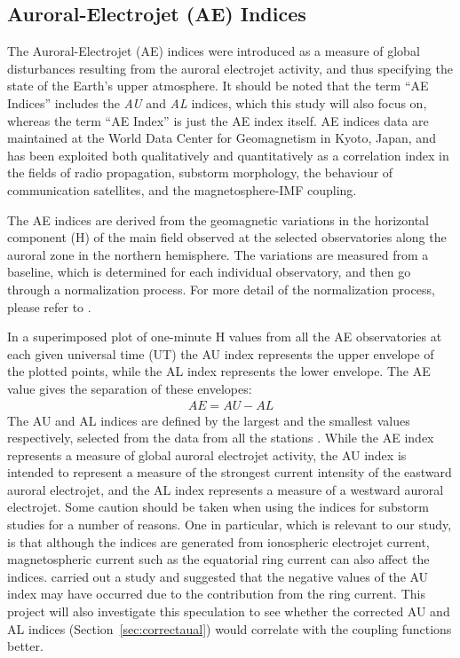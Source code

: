 \documentclass[12pt]{report} %
\begin{document}
\subsection{Auroral-Electrojet (AE) Indices}\label{sec:ae}

The Auroral-Electrojet (AE) indices were introduced as a measure of global disturbances resulting from the auroral electrojet activity, and thus specifying the state of the Earth's upper atmosphere. It should be noted that the term ``AE Indices'' includes the \emph{AU} and \emph{AL} indices, which this study will also focus on,  whereas the term ``AE Index'' is just the AE index itself. AE indices data are maintained at the World Data Center for Geomagnetism in Kyoto, Japan, and  has been exploited both qualitatively and quantitatively as a correlation index in the fields of radio propagation, substorm morphology, the behaviour of communication satellites, and the magnetosphere-IMF coupling.

The AE indices are derived from the geomagnetic variations in the horizontal component (H) of the main field observed at the selected observatories along the auroral zone in the northern hemisphere. The variations are measured from a baseline, which is determined for each individual observatory, and then go through a normalization process. For more detail of the normalization process, please refer to \cite{men11}. 

In a superimposed plot of one-minute H values from all the AE observatories at each given universal time (UT) the AU index represents the upper envelope of the plotted points, while the AL index represents the lower envelope. The AE value gives the separation of these envelopes:
\begin{align}
AE = AU -AL \label{eq:5}
\end{align}
The AU and AL indices are defined by the largest and the smallest values respectively, selected from the data from all the stations \citep{men11}. While the AE index represents a measure of global auroral electrojet activity, the AU index is intended to represent a measure of the strongest current intensity of the eastward auroral electrojet, and the AL index represents a measure of a westward auroral electrojet. Some caution should be taken when using the indices for substorm studies for a number of reasons. One in particular, which is relevant to our study, is that although the indices are generated from ionospheric electrojet current, magnetospheric current such as the equatorial ring current can also affect the indices. \cite{davis66} carried out a study and suggested that the negative values of the AU index may have occurred due to the contribution from the ring current. This project will also investigate this speculation to see whether the corrected AU and AL indices (Section~\ref{sec:correctaual}) would correlate with the coupling functions better. 
\vspace{-10pt}
\end{document}
